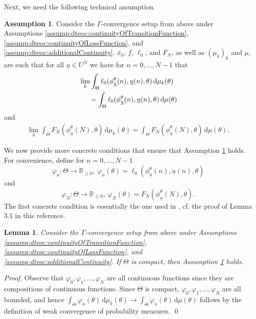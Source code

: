 \documentclass[letterpaper, 10 pt, conference]{IEEEconf}  %
\newcommand{\Rnn}{\mathbb{R}_{\geq 0}} %
\newcommand{\diff}{\, \mathrm{d}} %
\newcommand{\s}{\phi} %
\newcommand{\es}{\bar{x}} %
\newcommand{\is}[1]{{\underline{#1}}} %
\theoremstyle{theorem}
\newtheorem{lemma}[theorem]{Lemma}
\theoremstyle{definition}
\newtheorem{assumption}{Assumption}
\theoremstyle{remark}
\begin{document}
Next, we need the following technical assumption.
\begin{assumption} \label{assump:dteoc:convergenceOfIntegralTerms}
Consider the $\Gamma$-convergence setup from above under Assumptions \ref{assump:dteoc:continuityOfTransitionFunction}, \ref{assump:dteoc:continuityOfLossFunction}, and \ref{assump:dteoc:additionalContinuity}.
$\es_0$, $f$, $\ell_0$, and $F_N$, as well as $(\mu_k)_k$ and $\mu$, are such that for all $\is{u}\in U^N$ we have for $n=0,\ldots,N-1$ that
\begin{align*}
    & \lim_k \int_\Theta \ell_0(\s_{\is{u}}^\theta(n),\is{u}(n),\theta) \diff \mu_k(\theta) \nonumber \\
    & \hspace{0.5cm} = \int_\Theta \ell_0(\s_{\is{u}}^\theta(n),\is{u}(n),\theta) \diff \mu(\theta)
\end{align*}
and
\begin{align*}
    \lim_k\int_\Theta F_N(\s_{\is{u}}^\theta(N),\theta) \diff \mu_k(\theta) 
    = \int_\Theta F_N(\s_{\is{u}}^\theta(N),\theta) \diff \mu(\theta).
\end{align*}
\end{assumption}
We now provide more concrete conditions that ensure that Assumption \ref{assump:dteoc:convergenceOfIntegralTerms} holds.
For convenience, define for $n=0,\ldots,N-1$
\begin{equation}
 \varphi_n \colon \Theta \rightarrow \Rnn, \: \varphi_n(\theta)= \ell_0(\s_{\is{u}}^\theta(n),\is{u}(n),\theta)
\end{equation}
and
\begin{equation}
    \varphi_N \colon \Theta\rightarrow \Rnn, \: \varphi_N(\theta)=F_N(\s_{\is{u}}^\theta(N),\theta).
\end{equation}
The first concrete condition is essentially the one used in \cite{scagliotti2023optimal}, cf. the proof of Lemma 3.1 in this reference.
\begin{lemma}
Consider the $\Gamma$-convergence setup from above under Assumptions \ref{assump:dteoc:continuityOfTransitionFunction}, \ref{assump:dteoc:continuityOfLossFunction}, and \ref{assump:dteoc:additionalContinuity}.
If $\Theta$ is compact, then Assumption \ref{assump:dteoc:convergenceOfIntegralTerms} holds.
\end{lemma}
\begin{proof}
Observe that $\varphi_0,\varphi_1,\ldots,\varphi_N$ are all continuous functions since they are compositions of continuous functions.
Since $\Theta$ is compact, $\varphi_0,\varphi_1,\ldots,\varphi_N$ are all bounded,
and hence $\int_\Theta \varphi_n(\theta)\diff\mu_k(\theta)\rightarrow\int_\Theta \varphi_n(\theta)\diff\mu(\theta)$ follows by the definition of weak convergence of probability measures. \qed
\end{proof}
\end{document}
